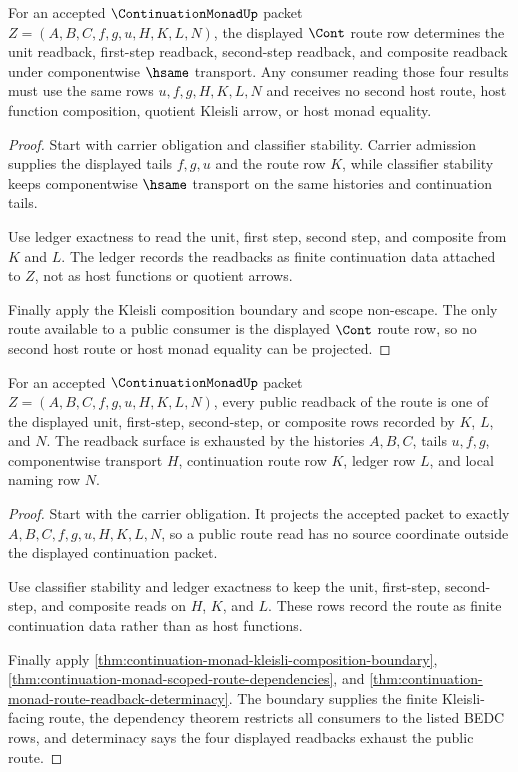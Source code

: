 \begin{theorem}
\label{thm:continuation-monad-route-readback-determinacy}
For an accepted $\ContinuationMonadUp$ packet $Z=(A,B,C,f,g,u,H,K,L,N)$, the displayed $\Cont$ route row determines the unit readback, first-step readback, second-step readback, and composite readback under componentwise $\hsame$ transport. Any consumer reading those four results must use the same rows $u,f,g,H,K,L,N$ and receives no second host route, host function composition, quotient Kleisli arrow, or host monad equality.
\end{theorem}
\begin{proof}
Start with carrier obligation and classifier stability. Carrier admission supplies the displayed tails $f,g,u$ and the route row $K$, while classifier stability keeps componentwise $\hsame$ transport on the same histories and continuation tails.

Use ledger exactness to read the unit, first step, second step, and composite from $K$ and $L$. The ledger records the readbacks as finite continuation data attached to $Z$, not as host functions or quotient arrows.

Finally apply the Kleisli composition boundary and scope non-escape. The only route available to a public consumer is the displayed $\Cont$ route row, so no second host route or host monad equality can be projected.
\end{proof}

\begin{theorem}
\label{thm:continuation-monad-route-readback-totality}
For an accepted $\ContinuationMonadUp$ packet $Z=(A,B,C,f,g,u,H,K,L,N)$, every public readback of the route is one of the displayed unit, first-step, second-step, or composite rows recorded by $K$, $L$, and $N$. The readback surface is exhausted by the histories $A,B,C$, tails $u,f,g$, componentwise transport $H$, continuation route row $K$, ledger row $L$, and local naming row $N$.
\end{theorem}
\begin{proof}
Start with the carrier obligation. It projects the accepted packet to exactly $A,B,C,f,g,u,H,K,L,N$, so a public route read has no source coordinate outside the displayed continuation packet.

Use classifier stability and ledger exactness to keep the unit, first-step, second-step, and composite reads on $H$, $K$, and $L$. These rows record the route as finite continuation data rather than as host functions.

Finally apply \autoref{thm:continuation-monad-kleisli-composition-boundary}, \autoref{thm:continuation-monad-scoped-route-dependencies}, and \autoref{thm:continuation-monad-route-readback-determinacy}. The boundary supplies the finite Kleisli-facing route, the dependency theorem restricts all consumers to the listed BEDC rows, and determinacy says the four displayed readbacks exhaust the public route.
\end{proof}

